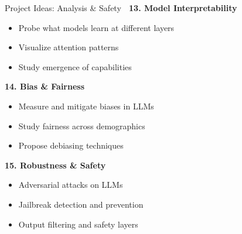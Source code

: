 \documentclass[aspectratio=169]{beamer}
\begin{document}
\begin{frame}[shrink=10]{Project Ideas: Analysis \& Safety 🔬}
\textbf{13. Model Interpretability}
\begin{itemize}\setlength{\itemsep}{0pt}
    \item Probe what models learn at different layers
    \item Visualize attention patterns
    \item Study emergence of capabilities
\end{itemize}

\vspace{0.5em}

\textbf{14. Bias \& Fairness}
\begin{itemize}\setlength{\itemsep}{0pt}
    \item Measure and mitigate biases in LLMs
    \item Study fairness across demographics
    \item Propose debiasing techniques
\end{itemize}

\vspace{0.5em}

\textbf{15. Robustness \& Safety}
\begin{itemize}\setlength{\itemsep}{0pt}
    \item Adversarial attacks on LLMs
    \item Jailbreak detection and prevention
    \item Output filtering and safety layers
\end{itemize}
\end{frame}
\end{document}
